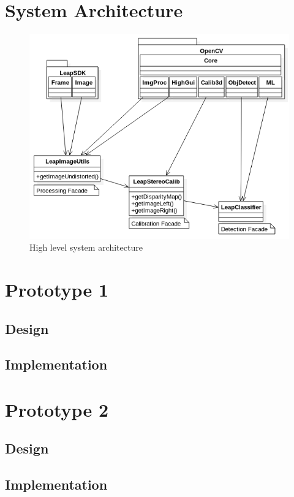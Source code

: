 \documentclass[11pt,oneside]{report}
\begin{document}
	\section{System Architecture}
	\begin{figure}[ht]
			\begin{center}
    			\includegraphics[scale=0.5]{system_architecture_1}
    			\caption{High level system architecture \protect {\label{fig:system_arch_1}}}
    		\end{center}
			\end{figure}	
	\section{Prototype 1}\label{sec:p1}
		\subsection{Design}
		\subsection{Implementation}
	\section{Prototype 2}\label{sec:p2}
		\subsection{Design}
		\subsection{Implementation}
\end{document}
